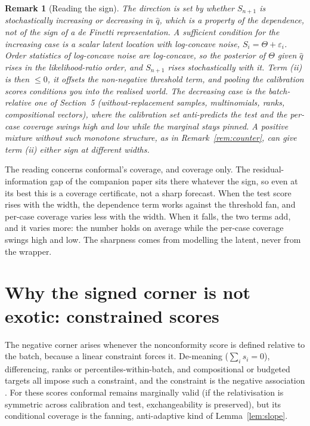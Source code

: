 \documentclass[11pt]{article}
\newtheorem{remark}{Remark}
\begin{document}
\begin{remark}[Reading the sign]
The direction is set by whether $S_{n+1}$ is stochastically increasing or decreasing in
$\hat q$, which is a property of the dependence, not of the sign of a de Finetti representation.
A sufficient condition for the increasing case is a scalar latent location with log-concave noise,
$S_i=\Theta+\varepsilon_i$. Order statistics of log-concave noise are log-concave, so the posterior of
$\Theta$ given $\hat q$ rises in the likelihood-ratio order, and $S_{n+1}$ rises stochastically with
it. Term (ii) is then $\le 0$, it offsets the non-negative threshold term, and pooling the calibration scores
conditions you into the realised world. The decreasing case is the batch-relative one of
Section~5 (without-replacement samples, multinomials, ranks, compositional vectors), where the
calibration set anti-predicts the test and the per-case coverage swings high and low while the
marginal stays pinned. A positive mixture without such monotone structure, as in
Remark~\ref{rem:counter}, can give term (ii) either sign at different widths.
\end{remark}

The reading concerns conformal's coverage, and coverage only. The residual-information
gap of the companion paper sits there whatever the sign, so even at its best this is a coverage
certificate, not a sharp forecast. When the test score rises with the width, the dependence term
works against the threshold fan, and per-case coverage varies less with the width. When it falls,
the two terms add, and it varies more: the number holds on
average while the per-case coverage swings high and low. The sharpness comes from modelling the
latent, never from the wrapper.

\section{Why the signed corner is not exotic: constrained scores}

The negative corner arises whenever the nonconformity score is defined relative to the
batch, because a linear constraint forces it. De-meaning ($\sum_i s_i=0$), differencing,
ranks or percentiles-within-batch, and compositional or budgeted targets all impose such a
constraint, and the constraint is the negative association \citep{joagdev1983}. For
these scores conformal remains marginally valid (if the relativisation is symmetric across
calibration and test, exchangeability is preserved), but its conditional coverage is the
fanning, anti-adaptive kind of Lemma~\ref{lem:slope}.
\end{document}
